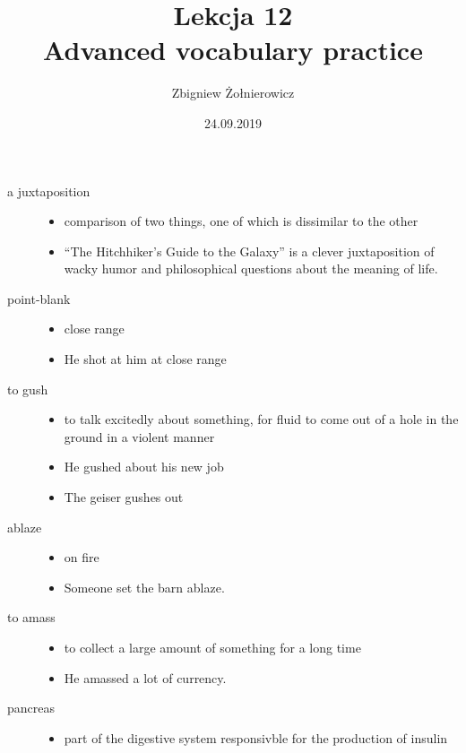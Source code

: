 \documentclass[a4paper]{article}
\begin{document}
\title{{\huge Lekcja 12} \\
{\large Advanced vocabulary practice}}
\author{Zbigniew Żołnierowicz}
\date{24.09.2019}
\maketitle
\begin{description}
    \item[a juxtaposition] \begin{itemize}
        \item comparison of two things, one of which is dissimilar to the other
        \item ``The Hitchhiker's Guide to the Galaxy'' is a clever juxtaposition of wacky humor and philosophical questions about the meaning of life.
    \end{itemize}
    \item[point-blank] \begin{itemize}
        \item close range
        \item He shot at him at close range
    \end{itemize}
    \item[to gush] \begin{itemize}
        \item to talk excitedly about something, for fluid to come out of a hole in the ground in a violent manner
        \item He gushed about his new job
        \item The geiser gushes out
    \end{itemize}
    \item[ablaze] \begin{itemize}
        \item on fire
        \item Someone set the barn ablaze.
    \end{itemize}
    \item[to amass] \begin{itemize}
        \item to collect a large amount of something for a long time
        \item He amassed a lot of currency.
    \end{itemize}
    \item[pancreas] \begin{itemize}
        \item part of the digestive system responsivble for the production of insulin

\end{itemize}
\end{description}
\end{document}
